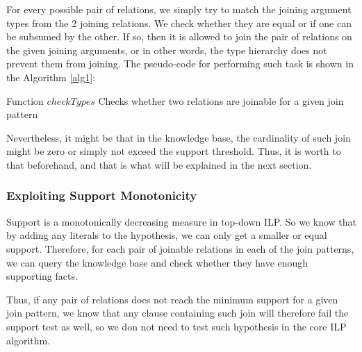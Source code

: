 For every possible pair of relations, we simply try to match the joining argument types from the 2 joining relations. We
check whether they are equal or if one can be subsumed by the other. If so, then it is allowed to join the pair of
relations
on the given joining arguments, or in other words, the type hierarchy does not prevent them from joining. The
pseudo-code
for performing such task is
shown in the Algorithm \ref{alg1}:

\begin{algorithm}[!h]
  \caption{Function $checkTypes$ \newline Checks whether two relations are joinable for a given join pattern}
 \label{alg1}
   {
  }
   {
  }
\end{algorithm}

Nevertheless, it might be that in the knowledge base, the cardinality of such join might be zero or simply not exceed
the support threshold. Thus, it is worth to that beforehand, and that is what will be explained in the next section.

\subsubsection{Exploiting Support Monotonicity}

Support is a monotonically decreasing measure in top-down ILP. So we know that by adding any
literals to the hypothesis, we can only get a smaller or equal support. Therefore, for each pair of joinable relations
in each of the join patterns, we can query the knowledge base and check whether they have enough supporting facts.

Thus, if any pair of relations does not reach the minimum support for a given join pattern, we know that any clause
containing such join will therefore fail the support test as well, so we don not need to test such hypothesis in the
core
ILP algorithm.

